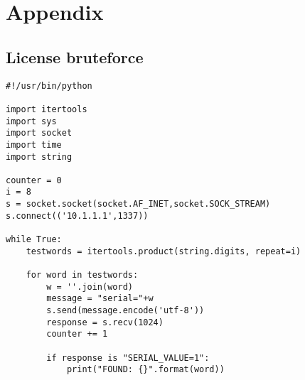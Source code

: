 \documentclass[10pt,a4paper]{article}
\begin{document}
\newpage
\section{Appendix}

\subsection{License bruteforce}
\begin{verbatim}
#!/usr/bin/python

import itertools
import sys
import socket
import time
import string

counter = 0
i = 8
s = socket.socket(socket.AF_INET,socket.SOCK_STREAM)
s.connect(('10.1.1.1',1337))

while True:
    testwords = itertools.product(string.digits, repeat=i)

    for word in testwords:
        w = ''.join(word)
        message = "serial="+w
        s.send(message.encode('utf-8'))
        response = s.recv(1024)
        counter += 1

        if response is "SERIAL_VALUE=1":
            print("FOUND: {}".format(word))
\end{verbatim}

\newpage
\end{document}
